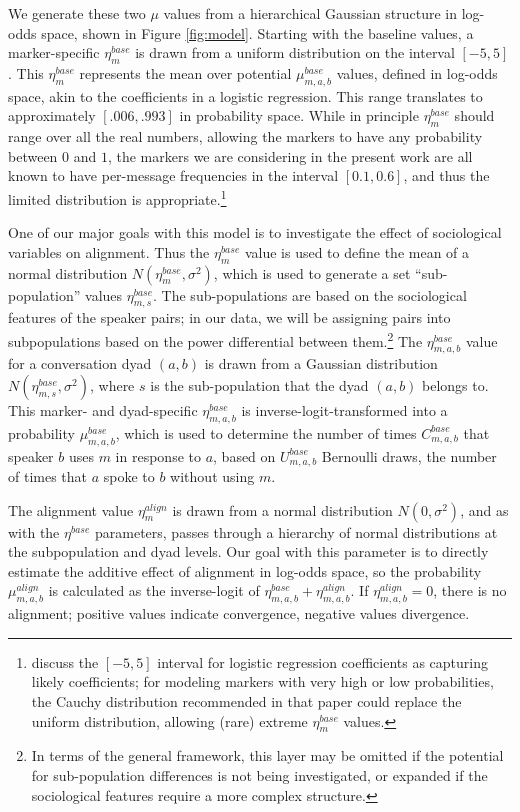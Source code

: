 \documentclass{acm_proc_article-sp}
\begin{document}
We generate these two $\mu$ values from a hierarchical Gaussian structure in log-odds space, shown in Figure \ref{fig:model}.  Starting with the baseline values, a marker-specific $\eta^{base}_m$ is drawn from a uniform distribution on the interval $[-5,5]$. This $\eta^{base}_m$ represents the mean over potential $\mu^{base}_{m,a,b}$ values, defined in log-odds space, akin to the coefficients in a logistic regression. This range translates to approximately $[.006,.993]$ in probability space.  While in principle $\eta^{base}_m$ should range over all the real numbers, allowing the markers to have any probability between $0$ and $1$, the markers we are considering in the present work are all known to have per-message frequencies in the interval $[0.1,0.6]$, and thus the limited distribution is appropriate.\footnote{\cite{GelmanEtAl2008} discuss the $[-5,5]$ interval for logistic regression coefficients as capturing likely coefficients; for modeling markers with very high or low probabilities, the Cauchy distribution recommended in that paper could replace the uniform distribution, allowing (rare) extreme $\eta^{base}_m$ values.}  

One of our major goals with this model is to investigate the effect of sociological variables on alignment. Thus the $\eta^{base}_m$ value is used to define the mean of a normal distribution $N(\eta^{base}_m,\sigma^2)$, which is used to generate a set ``sub-population'' values $\eta^{base}_{m,s}$.  The sub-populations are based on the sociological features of the speaker pairs; in our data, we will be assigning pairs into subpopulations based on the power differential between them.\footnote{In terms of the general framework, this layer may be omitted if the potential for sub-population differences is not being investigated, or expanded if the sociological features require a more complex structure.} The $\eta^{base}_{m,a,b}$ value for a conversation dyad $(a,b)$ is drawn from a Gaussian distribution $N(\eta^{base}_{m,s},\sigma^2)$, where $s$ is the sub-population that the dyad $(a,b)$ belongs to. This marker- and dyad-specific $\eta^{base}_{m,a,b}$ is inverse-logit-transformed into a probability $\mu^{base}_{m,a,b}$, which is used to determine the number of times $C^{base}_{m,a,b}$ that speaker $b$ uses $m$ in response to $a$, based on $U^{base}_{m,a,b}$ Bernoulli draws, the number of times that $a$ spoke to $b$ without using $m$.

The alignment value $\eta^{align}_m$ is drawn from a normal distribution $N(0,\sigma^2)$, and as with the $\eta^{base}$ parameters, passes through a hierarchy of normal distributions at the subpopulation and dyad levels. Our goal with this parameter is to directly estimate the additive effect of alignment in log-odds space, so the probability $\mu^{align}_{m,a,b}$ is calculated as the inverse-logit of $\eta^{base}_{m,a,b}+\eta^{align}_{m,a,b}$.  If $\eta^{align}_{m,a,b} = 0$, there is no alignment; positive values indicate convergence, negative values divergence.
\end{document}
